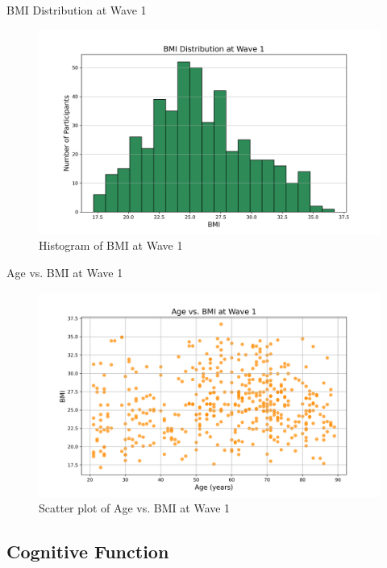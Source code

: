 \documentclass{beamer}
\begin{document}
\begin{frame}{BMI Distribution at Wave 1}
  \begin{figure}
    \centering
    \includegraphics[width=0.8\linewidth]{bmi_distribution.png}
    \caption{Histogram of BMI at Wave 1}
  \end{figure}
\end{frame}

\begin{frame}{Age vs. BMI at Wave 1}
  \begin{figure}
    \centering
    \includegraphics[width=0.8\linewidth]{age_vs_bmi_w1.png}
    \caption{Scatter plot of Age vs. BMI at Wave 1}
  \end{figure}
\end{frame}

\subsection{Cognitive Function}
\end{document}
